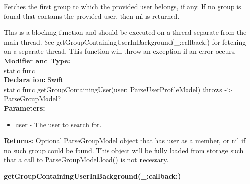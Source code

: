 {{{{{{{{{Fetches the first group to which the provided user belongs, if any. If no group is found that contains the provided user, then nil is returned.

This is a blocking function and should be executed on a thread separate from the main thread. See getGroupContainingUserInBackground(\_:callback:) for fetching on a separate thread. This function will throw an exception if an error occurs.\\

\textbf{Modifier and Type:}\\
\taboverride static func\\


\textbf{Declaration:}
\tab 
Swift\\

static func getGroupContainingUser(user: ParseUserProfileModel) throws -> ParseGroupModel?\\

\textbf{Parameters:}
\begin{itemize}
\item   user  - The user to search for.
\end{itemize}

\textbf{Returns:}
Optional ParseGroupModel object that has user as a member, or nil if no such group could be found. This object will be fully loaded from storage such that a call to ParseGroupModel.load() is not necessary.\\



\hypertarget{class_ParseGroupModel.iOS.getGroupContainingUserInBackground}{
\label{ParseGroupModel.iOS.getGroupContainingUserInBackground}
\textbf{getGroupContainingUserInBackground(\_:callback:)}

}}}}}}}}}}
